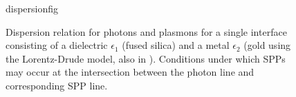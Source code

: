 \begin{figure}[ht]
 \centering
{dispersionfig}
\caption{ Dispersion relation for photons and plasmons for a single
interface consisting of a dielectric $\epsilon_1$ (fused silica) and a
metal $\epsilon_2$ (gold using the Lorentz-Drude model, also in
). Conditions under which SPPs may occur at the
intersection between the photon line and corresponding SPP line.  }
\label{fig:dispersionrelation}
\end{figure}

